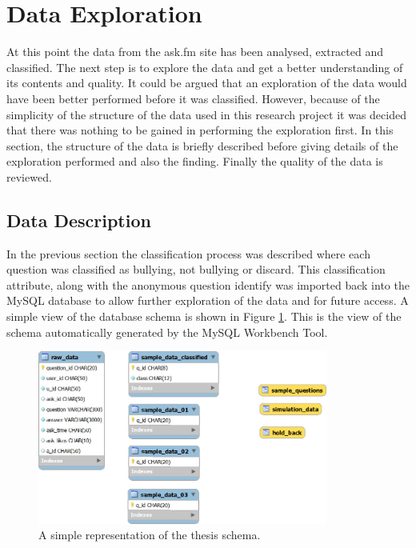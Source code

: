 \section{Data Exploration}
\label{section:data_exploration}

At this point the data from the ask.fm site has been analysed, extracted and classified. The next step is to explore the data and get a better understanding of its contents and quality. It could be argued that an exploration of the data would have been better performed before it was classified. However, because of the simplicity of the structure of the data used in this research project it was decided that there was nothing to be gained in performing the exploration first. In this section, the structure of the data is briefly described before giving details of the exploration performed and also the finding. Finally the quality of the data is reviewed.

\subsection{Data Description}
In the previous section the classification process was described where each question was classified as bullying, not bullying or discard. This classification attribute, along with the anonymous question identify was imported back into the MySQL database to allow further exploration of the data and for future access. A simple view of the database schema is shown in Figure \ref{fig:chapter4:thesis_schema}. This is the view of the schema automatically generated by the MySQL Workbench Tool.

\begin{figure}[htbp]
	\centering
	\includegraphics[width=0.85\textwidth]{Figures/Chapter4/thesis_schema.jpg}
	\caption[View of the thesis schema]{A simple representation of the thesis schema.}
	\label{fig:chapter4:thesis_schema}
\end{figure}

